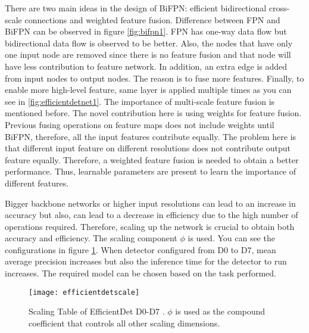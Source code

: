 \documentclass{article}
\begin{document}
There are two main ideas in the design of BiFPN: efficient bidirectional 
cross-scale connections and weighted feature fusion. Difference between 
FPN and BiFPN can be observed in figure \ref{fig:bifpn1}. FPN has one-way 
data flow but bidirectional data flow is observed to be better. Also, 
the nodes that have only one input node are removed since there is no 
feature fusion and that node will have less contribution to feature network. 
In addition, an extra edge is added from input nodes to output nodes. The 
reason is to fuse more features. Finally, to enable more high-level feature, 
same layer is applied multiple times as you can see in \ref{fig:efficientdetnet1}.
The importance of multi-scale feature fusion is mentioned before. The novel contribution 
here is using weights for feature fusion. Previous fusing operations 
on feature maps does not include weights until BiFPN, therefore, all the 
input features contribute equally. The problem here is that different 
input feature on different resolutions does not contribute output feature 
equally. Therefore, a weighted feature fusion is needed to obtain a better 
performance. Thus, learnable parameters are present to learn the importance 
of different features. \par

Bigger backbone networks or higher input resolutions can lead to an increase 
in accuracy but also, can lead to a decrease in efficiency due to the high 
number of operations required. Therefore, scaling up the network is crucial 
to obtain both accuracy and efficiency. The scaling component $\phi$ is used. 
You can see the configurations in figure \ref{fig:efficientdetscale1}. 
When detector configured from D0 to D7, mean average precision increases but 
also the inference time for the detector to run increases. The required model 
can be chosen based on the task performed. 

\begin{figure}
    \centering
    \texttt{[image: efficientdetscale]}
    \caption{Scaling Table of EfficientDet D0-D7 \cite{efficientdetcite}. $\phi$ is used as 
    the compound coefficient that controls all other scaling dimensions.}
    \label{fig:efficientdetscale1}
\end{figure}
\end{document}
